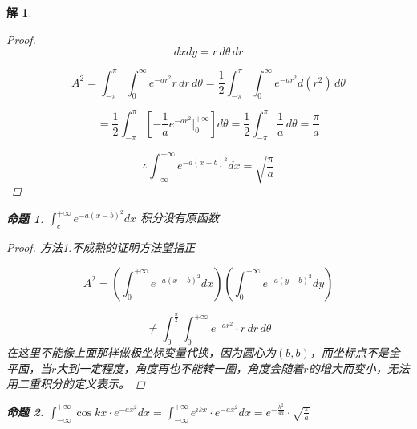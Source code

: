 \documentclass[12pt,a4paper]{article}
\newtheorem*{solution}{解}
\newtheorem{example}{命题}
\begin{document}
\begin{solution}
\begin{proof}
	\begin{equation*}
		dx dy = r \, d\theta \, dr
	\end{equation*}
	
	\begin{equation*}
		A^2 = \int_{-\pi}^{\pi} \int_{0}^{\infty} e^{-ar^2} r \, dr \, d\theta	= \frac{1}{2} \int_{-\pi}^{\pi} \int_{0}^{\infty} e^{-ar^2} d(r^2) \, d\theta
	\end{equation*}
	
	
	\begin{equation*}
		= \frac{1}{2} \int_{-\pi}^{\pi} \left[ -\frac{1}{a} e^{-ar^2} \Big|_{0}^{+\infty} \right] d\theta= \frac{1}{2} \int_{-\pi}^{\pi} \frac{1}{a} \, d\theta	= \frac{\pi}{a}
	\end{equation*}
	
	
	\begin{equation*}
	\therefore	\int_{-\infty}^{+\infty} e^{-a(x-b)^2} dx = \sqrt{\frac{\pi}{a}}
	\end{equation*}
	
	\end{proof}

	\begin{example}
		\label{ex:2}
			$	\int_{c}^{+\infty} e^{-a(x-b)^2} dx$
		积分没有原函数
	\end{example}
	
	\begin{proof}
		
		
		方法1.不成熟的证明方法望指正
		
		


	
	\begin{equation*}
		A^2 = \left( \int_{0}^{+\infty} e^{-a(x-b)^2} dx \right) \left( \int_{0}^{+\infty} e^{-a(y-b)^2} dy \right)
	\end{equation*}
	
	\begin{equation*}
		\neq \int_{0}^{\frac{\pi}{2}} \int_{0}^{+\infty} e^{-ar^2} \cdot r \, dr \, d\theta
	\end{equation*}
	在这里不能像上面那样做极坐标变量代换，因为圆心为$(b,b)$，而坐标点不是全平面，当$r$大到一定程度，角度再也不能转一圈，角度会随着$r$的增大而变小，无法用二重积分的定义表示。

	
	\end{proof}

	
	\begin{example}\label{ex:3}
			$\int_{-\infty}^{+\infty} \cos kx \cdot e^{-a x^2} dx=\int_{-\infty}^{+\infty} e^{ikx} \cdot e^{-a x^2} dx= e^{-\frac{k^2}{4a}} \cdot \sqrt{\frac{\pi}{a}}$
	\end{example}
	

\end{solution}
\end{document}
